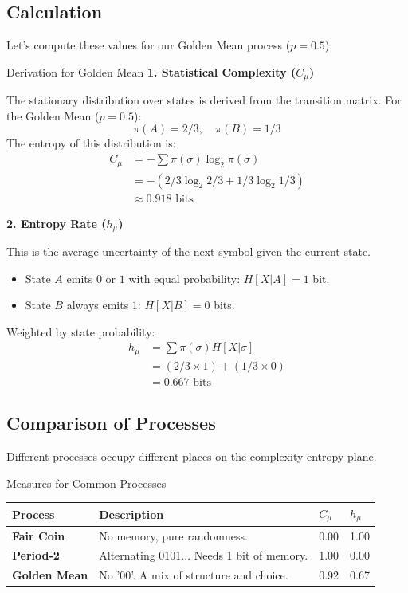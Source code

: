 \subsection{Calculation}

Let's compute these values for our Golden Mean process ($p=0.5$).

\begin{sidebar}{Derivation for Golden Mean}
    \textbf{1. Statistical Complexity ($C_\mu$)}

    The stationary distribution over states is derived from the transition matrix. For the Golden Mean ($p=0.5$):
    \[ \pi(A) = 2/3, \quad \pi(B) = 1/3 \]
    The entropy of this distribution is:
    \begin{align*}
    C_\mu &= - \sum \pi(\sigma) \log_2 \pi(\sigma) \\
          &= - (2/3 \log_2 2/3 + 1/3 \log_2 1/3) \\
          &\approx 0.918 \text{ bits}
    \end{align*}

    \textbf{2. Entropy Rate ($h_\mu$)}

    This is the average uncertainty of the next symbol given the current state.
    \begin{itemize}
        \item State $A$ emits $0$ or $1$ with equal probability: $H[X|A] = 1$ bit.
        \item State $B$ always emits $1$: $H[X|B] = 0$ bits.
    \end{itemize}
    Weighted by state probability:
    \begin{align*}
    h_\mu &= \sum \pi(\sigma) H[X|\sigma] \\
          &= (2/3 \times 1) + (1/3 \times 0) \\
          &= 0.667 \text{ bits}
    \end{align*}
\end{sidebar}

\subsection{Comparison of Processes}
Different processes occupy different places on the complexity-entropy plane.

\begin{emictable}[label=tab:measures]{Measures for Common Processes}
\begin{tabular}{lp{3.5cm}ll}
\toprule
Process & Description & $C_\mu$ & $h_\mu$ \\
\midrule
\textbf{Fair Coin} & No memory, pure randomness. & 0.00 & 1.00 \\
\textbf{Period-2} & Alternating 0101... Needs 1 bit of memory. & 1.00 & 0.00 \\
\textbf{Golden Mean} & No '00'. A mix of structure and choice. & 0.92 & 0.67 \\
\bottomrule
\end{tabular}
\end{emictable}
